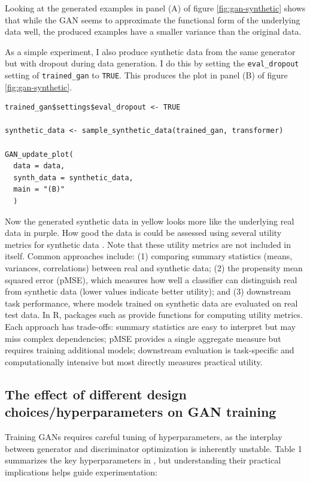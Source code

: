 Looking at the generated examples in panel (A) of figure \ref{fig:gan-synthetic} shows that while the GAN seems to approximate the functional form of the underlying data well, the produced examples have a smaller variance than the original data.

As a simple experiment, I also produce synthetic data from the same generator but with dropout during data generation. I do this by setting the \texttt{eval\_dropout} setting of \texttt{trained\_gan} to \texttt{TRUE}. This produces the plot in panel (B) of figure \ref{fig:gan-synthetic}.

\begin{verbatim}
trained_gan$settings$eval_dropout <- TRUE

synthetic_data <- sample_synthetic_data(trained_gan, transformer)

GAN_update_plot(
  data = data,
  synth_data = synthetic_data,
  main = "(B)"
  )
\end{verbatim}

Now the generated synthetic data in yellow looks more like the underlying real data in purple. How good the data is could be assessed using several utility metrics for synthetic data \citep[see, e.g.,][]{pmse}. Note that these utility metrics are not included in  itself. Common approaches include: (1) comparing summary statistics (means, variances, correlations) between real and synthetic data; (2) the propensity mean squared error (pMSE), which measures how well a classifier can distinguish real from synthetic data (lower values indicate better utility); and (3) downstream task performance, where models trained on synthetic data are evaluated on real test data. In R, packages such as  \citep{synthpop} provide functions for computing utility metrics. Each approach has trade-offs: summary statistics are easy to interpret but may miss complex dependencies; pMSE provides a single aggregate measure but requires training additional models; downstream evaluation is task-specific and computationally intensive but most directly measures practical utility.

\subsection{The effect of different design choices/hyperparameters on GAN training}\label{sec:hyperparameters}

Training GANs requires careful tuning of hyperparameters, as the interplay between generator and discriminator optimization is inherently unstable. Table 1 summarizes the key hyperparameters in , but understanding their practical implications helps guide experimentation:

